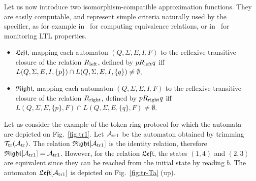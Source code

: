 \documentclass[]{llncs}
\def \A {\mathcal{A}}
\begin{document}
Let us now introduce two isomorphism-compatible approximation
functions. They are easily computable, and represent simple criteria
naturally used by the specifier, as for example 
in~\cite{bouajjani_abstract_2004} for computing equivalence relations, or 
in~\cite{DBLP:conf/fm/BauerF12} for monitoring LTL properties.
\begin{itemize}
\item $\mathfrak{Left}$, mapping each automaton $(Q,\Sigma,E,I,F)$ to the reflexive-transitive \linebreak[4]
closure of the relation $R_{\rm left}$,
  defined by $p R_{\rm left} q$  iff $L(Q,\Sigma,E,I,\{p\}) \cap \linebreak[4] L(Q,\Sigma, E,I,\{q\}) \neq \emptyset$.

\item $\mathfrak{Right}$, mapping each automaton $(Q,\Sigma,E,I,F)$ to the
  reflexive-transitive closure of the relation $R_{\rm right}$, defined by
  $p R_{\rm right} q$ iff $L(Q,\Sigma,E,\{p\},F)\cap
  L(Q,\Sigma,E,\{q\},F)\neq \emptyset$.




\end{itemize}

Let us consider the example of the token ring protocol for which the
automata are depicted on Fig.~\ref{fig:tr1}. Let $\A_{\rm tr1}$ be the
automaton obtained by trimming $\mathcal{T}_{\rm tr}(\A_{\rm
  tr})$. The relation $\mathfrak{Right}[\A_{\rm tr1}]$ is the identity
relation, therefore $\mathfrak{Right}[\A_{\rm tr1}]=\A_{\rm
  tr1}$. However, for the relation $\mathfrak{Left}$, the states
$(1,4)$ and $(2,3)$ are equivalent since they can be reached from the
initial state by reading $b$. The automaton $\mathfrak{Left}[\A_{\rm
  tr1}]$ is depicted on Fig.~\ref{fig:tr-Ta} (up).
\end{document}
